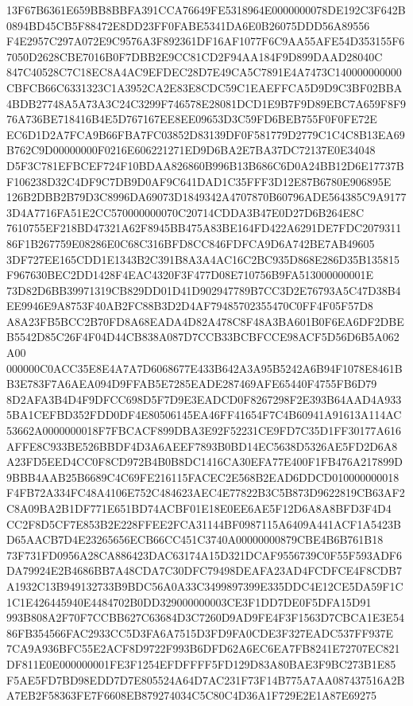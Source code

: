 \documentclass[UTF8,fontset=fandol,zihao=-4,a4paper]{ctexart}
\begin{document}
{{13F67B6361E659BB8BBFA391CCA76649FE5318964E0000000078DE192C3F642B0894BD45CB5F88472E8DD23FF0FABE5341DA6E0B26075DDD56A89556
F4E2957C297A072E9C9576A3F892361DF16AF1077F6C9AA55AFE54D353155F67050D2628CBE7016B0F7DBB2E9CC81CD2F94AA184F9D899DAAD28040C
847C40528C7C18EC8A4AC9EFDEC28D7E49CA5C7891E4A7473C140000000000CBFCB66C6331323C1A3952CA2E83E8CDC59C1EAEFFCA5D9D9C3BF02BBA
4BDB27748A5A73A3C24C3299F746578E28081DCD1E9B7F9D89EBC7A659F8F976A736BE718416B4E5D767167EE8EE09653D3C59FD6BEB755F0F0FE72E
EC6D1D2A7FCA9B66FBA7FC03852D83139DF0F581779D2779C1C4C8B13EA69B762C9D00000000F0216E606221271ED9D6BA2E7BA37DC72137E0E34048
D5F3C781EFBCEF724F10BDAA826860B996B13B686C6D0A24BB12D6E17737BF106238D32C4DF9C7DB9D0AF9C641DAD1C35FFF3D12E87B6780E906895E
126B2DBB2B79D3C8996DA69073D1849342A4707870B60796ADE564385C9A91773D4A7716FA51E2CC570000000070C20714CDDA3B47E0D27D6B264E8C
7610755EF218BD47321A62F8945BB475A83BE164FD422A6291DE7FDC207931186F1B267759E08286E0C68C316BFD8CC846FDFCA9D6A742BE7AB49605
3DF727EE165CDD1E1343B2C391B8A3A4AC16C2BC935D868E286D35B135815F967630BEC2DD1428F4EAC4320F3F477D08E710756B9FA513000000001E
73D82D6BB39971319CB829DD01D41D902947789B7CC3D2E76793A5C47D38B4EE9946E9A8753F40AB2FC88B3D2D4AF79485702355470C0FF4F05F57D8
A8A23FB5BCC2B70FD8A68EADA4D82A478C8F48A3BA601B0F6EA6DF2DBEB5542D85C26F4F04D44CB838A087D7CCB33BCBFCCE98ACF5D56D6B5A062A00
000000C0ACC35E8E4A7A7D6068677E433B642A3A95B5242A6B94F1078E8461BB3E783F7A6AEA094D9FFAB5E7285EADE287469AFE65440F4755FB6D79
8D2AFA3B4D4F9DFCC698D5F7D9E3EADCD0F8267298F2E393B64AAD4A9335BA1CEFBD352FDD0DF4E80506145EA46FF41654F7C4B60941A91613A114AC
53662A0000000018F7FBCACF899DBA3E92F52231CE9FD7C35D1FF30177A616AFFE8C933BE526BBDF4D3A6AEEF7893B0BD14EC5638D5326AE5FD2D6A8
A23FD5EED4CC0F8CD972B4B0B8DC1416CA30EFA77E400F1FB476A217899D9BBB4AAB25B6689C4C69FE216115FACEC2E568B2EAD6DDCD010000000018
F4FB72A334FC48A4106E752C484623AEC4E77822B3C5B873D9622819CB63AF2C8A09BA2B1DF771E651BD74ACBF01E18E0EE6AE5F12D6A8A8BFD3F4D4
CC2F8D5CF7E853B2E228FFEE2FCA31144BF0987115A6409A441ACF1A5423BD65AACB7D4E23265656ECB66CC451C3740A00000000879CBE4B6B761B18
73F731FD0956A28CA886423DAC63174A15D321DCAF9556739C0F55F593ADF6DA79924E2B4686BB7A48CDA7C30DFC79498DEAFA23AD4FCDFCE4F8CDB7
A1932C13B949132733B9BDC56A0A33C3499897399E335DDC4E12CE5DA59F1C1C1E426445940E4484702B0DD329000000003CE3F1DD7DE0F5DFA15D91
993B808A2F70F7CCBB627C63684D3C7260D9AD9FE4F3F1563D7CBCA1E3E5486FB354566FAC2933CC5D3FA6A7515D3FD9FA0CDE3F327EADC537FF937E
7CA9A936BFC55E2ACF8D9722F993B6DFD62A6EC6EA7FB8241E72707EC821DF811E0E000000001FE3F1254EFDFFFF5FD129D83A80BAE3F9BC273B1E85
F5AE5FD7BD98EDD7D7E805524A64D7AC231F73F14B775A7AA087437516A2BA7EB2F58363FE7F6608EB879274034C5C80C4D36A1F729E2E1A87E69275
}}
\end{document}
